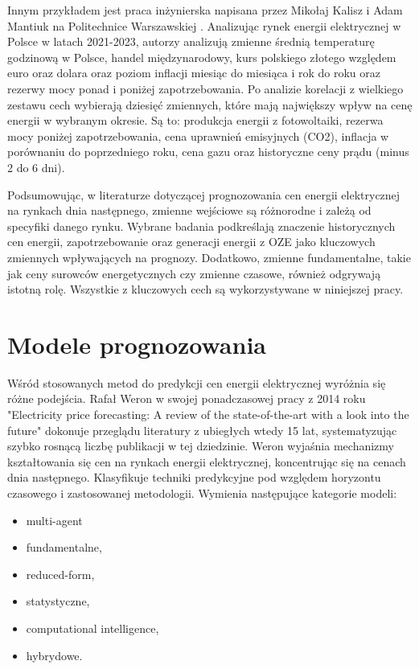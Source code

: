 Innym przykładem jest praca inżynierska napisana przez Mikołaj Kalisz i Adam Mantiuk na Politechnice Warszawskiej \cite{MGR2025}. Analizując rynek energii elektrycznej w Polsce w latach 2021-2023, autorzy analizują zmienne średnią temperaturę godzinową w Polsce, handel międzynarodowy, kurs polskiego złotego względem euro oraz dolara oraz poziom inflacji miesiąc do miesiąca i rok do roku oraz rezerwy mocy ponad i poniżej zapotrzebowania. Po analizie korelacji z wielkiego zestawu cech wybierają dziesięć zmiennych, które mają największy wpływ na cenę energii w wybranym okresie. Są to: produkcja energii z fotowoltaiki, rezerwa mocy poniżej zapotrzebowania, cena uprawnień emisyjnych (CO2), inflacja w porównaniu do poprzedniego roku, cena gazu oraz historyczne ceny prądu (minus 2 do 6 dni). 

Podsumowując, w literaturze dotyczącej prognozowania cen energii elektrycznej na rynkach dnia następnego, zmienne wejściowe są różnorodne i zależą od specyfiki danego rynku. Wybrane badania podkreślają znaczenie historycznych cen energii, zapotrzebowanie  oraz generacji energii z OZE jako kluczowych zmiennych wpływających na prognozy. Dodatkowo, zmienne fundamentalne, takie jak ceny surowców energetycznych czy zmienne czasowe, również odgrywają istotną rolę. Wszystkie z kluczowych cech są wykorzystywane w niniejszej pracy.

\section{Modele prognozowania}
\label{sec:modele_prognozowania_literatura}

Wśród stosowanych metod do predykcji cen energii elektrycznej wyróżnia się różne podejścia. Rafał Weron w swojej ponadczasowej pracy z 2014 roku "Electricity price forecasting: A review of the state-of-the-art with a look into the future" \cite{WERON20141030} dokonuje przeglądu literatury z ubiegłych wtedy 15 lat, systematyzując szybko rosnącą liczbę publikacji w tej dziedzinie. Weron wyjaśnia mechanizmy kształtowania się cen na rynkach energii elektrycznej, koncentrując się na cenach dnia następnego. Klasyfikuje techniki predykcyjne pod względem horyzontu czasowego i zastosowanej metodologii. Wymienia następujące kategorie modeli: 
\begin{itemize}
    \item multi-agent
    \item fundamentalne,
    \item reduced-form,
    \item statystyczne,
    \item computational intelligence,
    \item hybrydowe.
\end{itemize}


